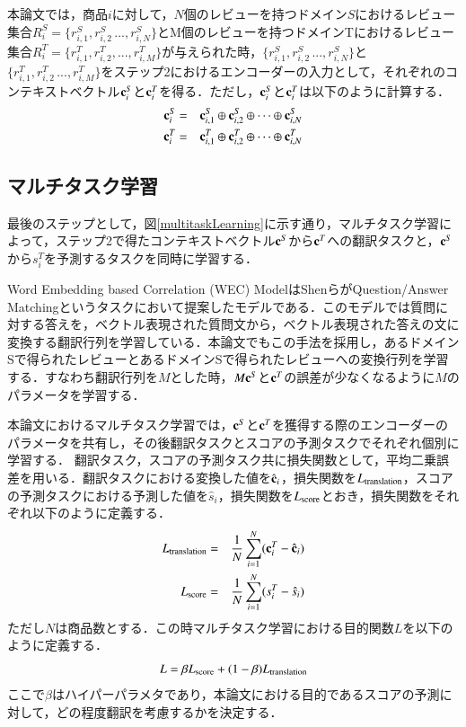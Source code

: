 \documentclass[dvipdfmx,twocolumn,10.5pt]{jsarticle}
\begin{document}
本論文では，商品$i$に対して，$N$個のレビューを持つドメイン$S$におけるレビュー集合$R^S_i = \{r^S_{i, 1}, r^S_{i, 2}\, ..., r^S_{i, N}\}$とM個のレビューを持つドメインTにおけるレビュー集合$R_i^T = \{ r^T_{i, 1}, r^T_{i, 2}, ..., r^T_{i, M}\}$が与えられた時，$\{r^S_{i, 1}, r^S_{i, 2}\, ..., r^S_{i, N}\}$と$\{r^T_{i, 1}, r^T_{i, 2}\, ..., r^T_{i, M}\}$をステップ2におけるエンコーダーの入力として，それぞれのコンテキストベクトル${\bf c}^S_i$と${\bf c}^T_i$を得る．ただし，${\bf c}^S_i$と${\bf c}^T_i$は以下のように計算する．
\begin{eqnarray}
 {\bf c}^S_i &=& {\bf c}^S_{i, 1} \oplus  {\bf c}^S_{i, 2} \oplus \cdots \oplus {\bf c}^S_{i, N} \\
  {\bf c}^T_i &=& {\bf c}^T_{i, 1} \oplus  {\bf c}^T_{i, 2} \oplus \cdots \oplus {\bf c}^T_{i, N}
\end{eqnarray}

\subsection{マルチタスク学習}\label{suggestion_create}
最後のステップとして，図\ref{multitaskLearning}に示す通り，マルチタスク学習によって，ステップ2で得たコンテキストベクトル${\bf c}^S$から$ {\bf c}^T$への翻訳タスクと，${\bf c}^S$から$s^T_i$を予測するタスクを同時に学習する．

Word Embedding based Correlation (WEC) Model\cite{shen2017word}はShenらがQuestion/Answer Matchingというタスクにおいて提案したモデルである．このモデルでは質問に対する答えを，ベクトル表現された質問文から，ベクトル表現された答えの文に変換する翻訳行列を学習している．本論文でもこの手法を採用し，あるドメインSで得られたレビューとあるドメインSで得られたレビューへの変換行列を学習する．すなわち翻訳行列を$M$とした時，$ M{\bf c}^S$と$ {\bf c}^T$の誤差が少なくなるように$M$のパラメータを学習する．
 
本論文におけるマルチタスク学習では，${\bf c}^S$と$ {\bf c}^T$を獲得する際のエンコーダーのパラメータを共有し，その後翻訳タスクとスコアの予測タスクでそれぞれ個別に学習する．
翻訳タスク，スコアの予測タスク共に損失関数として，平均二乗誤差を用いる．翻訳タスクにおける変換した値を$\hat{\bf c}_i$，損失関数を$L_{\rm translation} $，スコアの予測タスクにおける予測した値を$\hat{s}_i$，損失関数を$L_{\rm score}$とおき，損失関数をそれぞれ以下のように定義する．
\begin{eqnarray}
 L_{\rm translation} &=& \frac{1}{N} \sum_{i=1}^N({\bf c}_i^T - \hat{\bf c}_i) \\
 L_{\rm score} &=& \frac{1}{N} \sum_{i=1}^N({s}_i^T - \hat{s}_i)
\end{eqnarray}
ただし$N$は商品数とする．この時マルチタスク学習における目的関数$L$を以下のように定義する．
\begin{equation}
  L = \beta L_{\rm score} +  (1-\beta) L_{\rm translation}
\end{equation}
ここで$\beta$はハイパーパラメタであり，本論文における目的であるスコアの予測に対して，どの程度翻訳を考慮するかを決定する．
\end{document}
